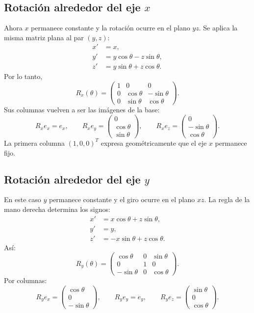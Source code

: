 \subsection{Rotación alrededor del eje \(x\)}

Ahora \(x\) permanece constante y la rotación ocurre en el plano \(yz\). Se aplica la misma
matriz plana al par \((y,z)\):
\[
\begin{aligned}
x'&=x,\\
y'&=y\cos\theta-z\sin\theta,\\
z'&=y\sin\theta+z\cos\theta.
\end{aligned}
\]
Por lo tanto,
\[
\boxed{
R_x(\theta)=
\begin{pmatrix}
1&0&0\\
0&\cos\theta&-\sin\theta\\
0&\sin\theta& \cos\theta
\end{pmatrix}
}.
\]
Sus columnas vuelven a ser las imágenes de la base:
\[
R_xe_x=e_x,\qquad
R_xe_y=
\begin{pmatrix}0\\\cos\theta\\\sin\theta\end{pmatrix},
\qquad
R_xe_z=
\begin{pmatrix}0\\-\sin\theta\\\cos\theta\end{pmatrix}.
\]
La primera columna \((1,0,0)^T\) expresa geométricamente que el eje \(x\) permanece fijo.

\subsection{Rotación alrededor del eje \(y\)}

En este caso \(y\) permanece constante y el giro ocurre en el plano \(xz\). La regla de la
mano derecha determina los signos:
\[
\begin{aligned}
x'&=x\cos\theta+z\sin\theta,\\
y'&=y,\\
z'&=-x\sin\theta+z\cos\theta.
\end{aligned}
\]
Así:
\[
\boxed{
R_y(\theta)=
\begin{pmatrix}
\cos\theta&0&\sin\theta\\
0&1&0\\
-\sin\theta&0&\cos\theta
\end{pmatrix}
}.
\]
Por columnas:
\[
R_ye_x=
\begin{pmatrix}\cos\theta\\0\\-\sin\theta\end{pmatrix},
\qquad
R_ye_y=e_y,
\qquad
R_ye_z=
\begin{pmatrix}\sin\theta\\0\\\cos\theta\end{pmatrix}.
\]

